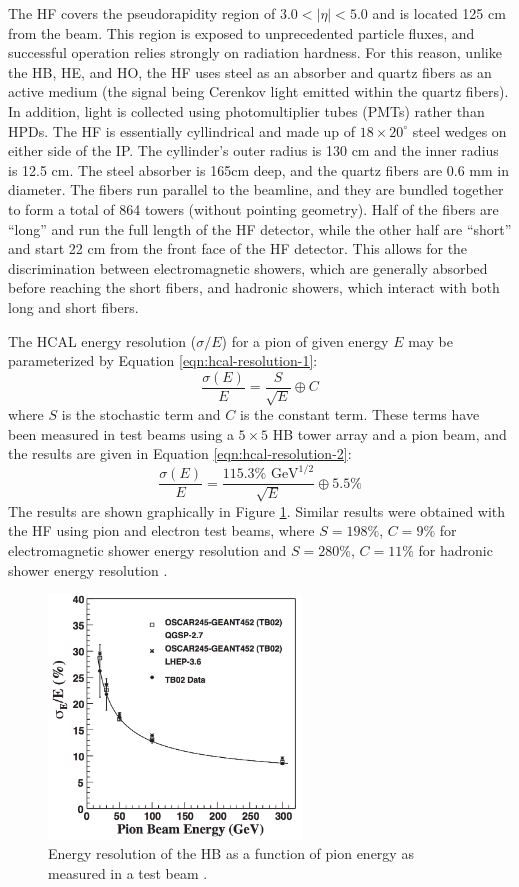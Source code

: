 The HF covers the pseudorapidity region of $3.0 < |\eta| < 5.0$ and is located
125 cm from the beam.  This region is exposed to unprecedented particle fluxes, 
and successful operation relies strongly on radiation hardness.  For this reason,
unlike the HB, HE, and HO, the HF uses steel as an absorber 
and quartz fibers as an active medium (the signal being 
Cerenkov light emitted within the quartz fibers).
In addition, light is collected using photomultiplier tubes (PMTs)
 rather than HPDs.
The HF is essentially cyllindrical and made up of $18\times20^{\circ}$ steel wedges on either
side of the IP.  The cyllinder's outer radius is 130 cm and the inner radius is 12.5 cm.
The steel absorber is 165cm deep, and the quartz fibers are 0.6 mm in diameter.
The fibers run parallel to the beamline, and they 
are bundled together to form a total of 864 towers (without pointing geometry).
Half of the fibers are ``long'' and run the full length of the HF detector, while
the other half are ``short'' and start 22 cm from the front face of the HF detector.
This allows for the discrimination between electromagnetic showers, which are 
generally absorbed before reaching the short fibers, and hadronic showers, 
which interact with both long and short fibers.

The HCAL energy resolution 
($\sigma/E$) for a pion of given energy $E$ may be parameterized by 
Equation \ref{eqn:hcal-resolution-1}:
\begin{equation}
  \frac{\sigma(E)}{E} =
  \frac{S}{\sqrt{E}} \oplus C 
  \label{eqn:hcal-resolution-1}
\end{equation}
where $S$ is the stochastic term and $C$ is the constant term.
These terms have been measured in test beams using a $5\times5$
HB tower array and a pion beam, and the results are given in
Equation \ref{eqn:hcal-resolution-2}:
\begin{equation}
  \frac{\sigma(E)}{E} =
  \frac{115.3\% \text{ GeV}^{1/2}}{\sqrt{E}} \oplus 5.5\%
  \label{eqn:hcal-resolution-2}
\end{equation}
The results are shown graphically in Figure \ref{fig:hcal-resolution}.
Similar results were obtained with the HF using pion and electron test beams,
where $S = 198\%$, $C = 9\%$ for electromagnetic shower energy resolution and $S = 280\%$, 
$C = 11\%$ for hadronic shower energy resolution \cite{cms-jinst,cms-tdr,hf-resolution}.

\begin{figure}
  \centering
  \includegraphics[width=0.6\textwidth]{tex/cms/fig/hcal-resolution.png}
  \caption{Energy resolution of the HB as a function of pion energy as measured in a test beam \cite{hcal-resolution}.}
  \label{fig:hcal-resolution}
\end{figure}


